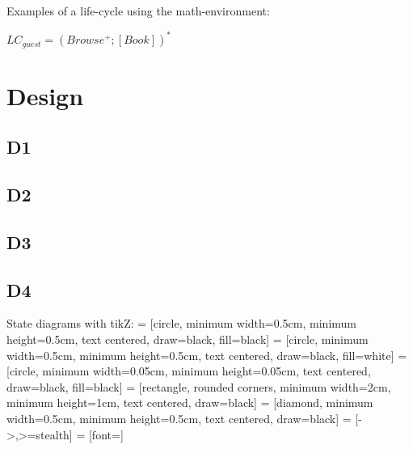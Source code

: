 \documentclass[a4paper,10pt,titlepage,bibtotoc,bibtotocnumbered]{scrreprt}
\begin{document}
Examples of a life-cycle using the math-environment:

$LC_{guest}=(Browse^+;[Book])^*$



\chapter{Design}

\section{D1}

\section{D2}

\section{D3}

\section{D4}

State diagrams with tikZ:
 = [circle, minimum width=0.5cm, minimum height=0.5cm, text centered, draw=black, fill=black]
 = [circle, minimum width=0.5cm, minimum height=0.5cm, text centered, draw=black, fill=white]
 = [circle, minimum width=0.05cm, minimum height=0.05cm, text centered, draw=black, fill=black]
 = [rectangle, rounded corners, minimum width=2cm, minimum height=1cm, text centered, draw=black]
 = [diamond, minimum width=0.5cm, minimum height=0.5cm, text centered, draw=black]
 = [->,>=stealth]
 = [font=\tiny]
\end{document}
